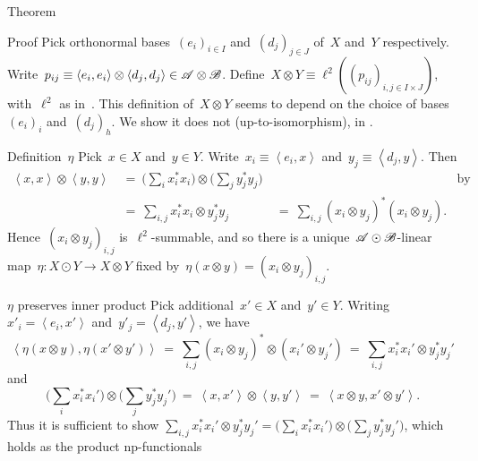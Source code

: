 \documentclass[b]{subfiles}
\begin{document}
\begin{parsec}
\begin{point}{Theorem}
\begin{enumerate}
\end{enumerate}
\begin{point}{Proof}%
Pick orthonormal bases~$(e_i)_{i \in I}$ and~$(d_j)_{j \in J}$ of~$X$
    and~$Y$ respectively.
Write~$p_{ij} \equiv \left<e_i, e_i\right>\otimes \left<d_j,d_j\right>
    \in \mathscr{A} \otimes \mathscr{B}$.
Define~$X \otimes Y \equiv \ell^2((p_{ij})_{i,j \in I\times J})$,
    with~$\ell^2$ as in~.
This definition of~$X \otimes Y$ seems to depend
    on the choice of bases~$(e_i)_i$ and~$(d_j)_h$.
    We show it does not (up-to-isomorphism), in .
\begin{point}{Definition~$\eta$}%
Pick~$x \in X$ and~$y \in Y$.
Write~$x_i \equiv \left<e_i, x\right>$
and~$y_j \equiv \left<d_j, y\right>$.
Then
\begin{align*}
    \left<x,x\right> \otimes \left<y,y\right>
    &\ = \ \bigl( \sum_i x_i^*x_i\bigr) \otimes\bigl(\sum_jy_j^*y_j\bigr)
            &\quad&\text{by Parseval}  \\
            &\ = \ \sum_{i,j}  x_i^*x_i  \otimes y_j^*y_j  %
            &\ = \ \sum_{i,j}  (x_i \otimes y_j)^* (x_i  \otimes y_j).
\end{align*}
Hence~$(x_i \otimes y_j)_{i,j}$ is~$\ell^2$-summable,
    and so there is a unique~$\mathscr{A} \odot\mathscr{B}$-linear
    map~$\eta\colon X \odot Y \to X \otimes Y$ fixed
    by~$\eta(x \otimes y) = (x_i \otimes y_j)_{i,j}$.
\end{point}
\begin{point}{$\eta$ preserves inner product}%
Pick additional~$x' \in X$ and~$y' \in Y$.
Writing~$x'_i = \left<e_i,x'\right>$
    and~$y'_j = \left<d_j, y'\right>$,
we have
\begin{equation*}
    \left<\eta(x\otimes y), \eta(x' \otimes y')\right>
    \ = \ \sum_{i,j} (x_i\otimes y_j)^* \otimes (x_i' \otimes y_j')
    \ = \ \sum_{i,j} x_i^*x_i' \otimes y_j^* y_j'
\end{equation*}
and
\begin{equation*}
    \bigl(\sum_i x_i^*x_i'\bigr) \otimes \bigl( \sum_j y_j^* y_j' \bigr)
    \ = \ \left<x,x'\right> \otimes \left<y,y'\right>
    \ = \ \left<x\otimes y,x' \otimes y'\right> .
\end{equation*}
Thus it is sufficient to show
    $\sum_{i,j} x_i^*x_i' \otimes y_j^* y_j'
    = \bigl(\sum_i x_i^*x_i'\bigr) \otimes \bigl( \sum_j y_j^* y_j' \bigr)$,
    which holds as the product np-functionals

\end{point}
\end{point}
\end{point}
\end{parsec}
\end{document}
